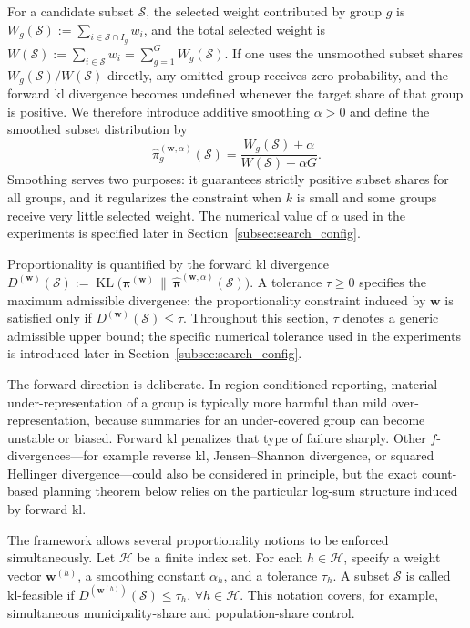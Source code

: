 \documentclass[10pt,journal]{IEEEtran}
\newcommand{\1}{\mathbf{1}}
\newcommand{\bw}{\mathbf{w}}
\newcommand{\bpi}{\boldsymbol{\pi}}
\newcommand{\Sel}{\mathcal{S}}
\DeclareMathOperator{\KL}{KL}
\theoremstyle{ieeethm}
\begin{document}
For a candidate subset $\Sel$, the selected weight contributed by group $g$ is $W_g(\Sel):=\sum_{i\in \Sel\cap I_g}w_i$, and the total selected weight is $W(\Sel):=\sum_{i\in\Sel}w_i=\sum_{g=1}^{G}W_g(\Sel)$. If one uses the unsmoothed subset shares $W_g(\Sel)/W(\Sel)$ directly, any omitted group receives zero probability, and the forward \gls{kl} divergence becomes undefined whenever the target share of that group is positive. We therefore introduce additive smoothing $\alpha>0$ and define the smoothed subset distribution by
\[
\widehat{\pi}_g^{(\bw,\alpha)}(\Sel)
=
\frac{W_g(\Sel)+\alpha}{W(\Sel)+\alpha G}.
\]
Smoothing serves two purposes: it guarantees strictly positive subset shares for all groups, and it regularizes the constraint when $k$ is small and some groups receive very little selected weight. The numerical value of $\alpha$ used in the experiments is specified later in Section~\ref{subsec:search_config}.

Proportionality is quantified by the forward \gls{kl} divergence
$D^{(\bw)}(\Sel)
:=
\KL\!\big(\bpi^{(\bw)}\,\big\|\,\widehat{\bpi}^{(\bw,\alpha)}(\Sel)\big)$.
A tolerance $\tau\ge 0$ specifies the maximum admissible divergence: the proportionality constraint induced by $\bw$ is satisfied only if $D^{(\bw)}(\Sel)\le \tau$. Throughout this section, $\tau$ denotes a generic admissible upper bound; the specific numerical tolerance used in the experiments is introduced later in Section~\ref{subsec:search_config}.

The forward direction is deliberate. In region-conditioned reporting, material under-representation of a group is typically more harmful than mild over-representation, because summaries for an under-covered group can become unstable or biased. Forward \gls{kl} penalizes that type of failure sharply. Other $f$-divergences---for example reverse \gls{kl}, Jensen--Shannon divergence, or squared Hellinger divergence---could also be considered in principle, but the exact count-based planning theorem below relies on the particular log-sum structure induced by forward \gls{kl}.

The framework allows several proportionality notions to be enforced simultaneously. Let $\mathcal{H}$ be a finite index set. For each $h\in\mathcal{H}$, specify a weight vector $\bw^{(h)}$, a smoothing constant $\alpha_h$, and a tolerance $\tau_h$. A subset $\Sel$ is called \gls{kl}-feasible if $D^{(\bw^{(h)})}(\Sel)\le \tau_h$, $\forall h\in\mathcal{H}$. This notation covers, for example, simultaneous municipality-share and population-share control.
\end{document}
